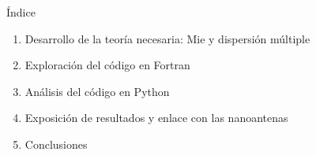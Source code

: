 \documentclass[aspectratio=43,11pt]{beamer}
\begin{document}
\begin{frame}{Índice}
  \vspace{10pt}
  \begin{enumerate}
    \setlength{\topsep}{0pt}
    \setlength{\itemsep}{14pt}
    \item Desarrollo de la teoría necesaria: Mie y dispersión múltiple
    \item Exploración del código en Fortran
    \item Análisis del código en Python
    \item Exposición de resultados y enlace con las nanoantenas
    \item Conclusiones
  \end{enumerate}
\end{frame}
\end{document}
